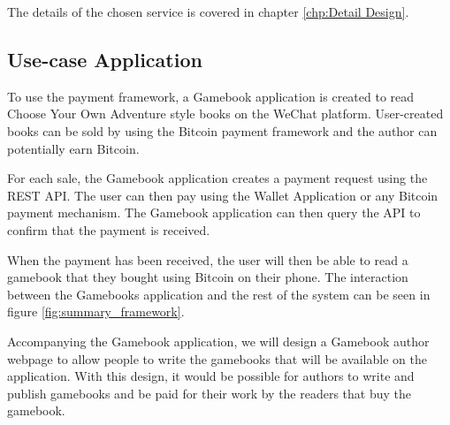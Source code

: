 The details of the chosen service is covered in chapter \ref{chp:Detail Design}.

\subsection{Use-case Application}

To use the payment framework, a Gamebook application is created to read Choose Your Own Adventure style books \cite{cyoa} on the WeChat platform. User-created books can be sold by using the Bitcoin payment framework and the author can potentially earn Bitcoin.

For each sale, the Gamebook application creates a payment request using the REST API. The user can then pay using the Wallet Application or any Bitcoin payment mechanism. The Gamebook application can then query the API to confirm that the payment is received. 

When the payment has been received, the user will then be able to read a gamebook that they bought using Bitcoin on their phone. The interaction between the Gamebooks application and the rest of the system can be seen in figure \ref{fig:summary_framework}.

Accompanying the Gamebook application, we will design a Gamebook author webpage to allow people to write the gamebooks that will be available on the application. With this design, it would be possible for authors to write and publish gamebooks and be paid for their work by the readers that buy the gamebook.